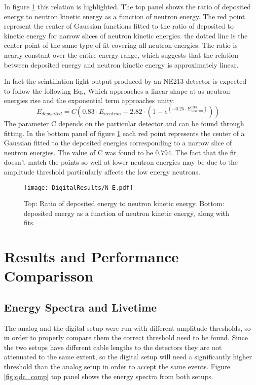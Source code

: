 \documentclass[main.tex]{subfiles}
\begin{document}
In figure \ref{fig:N_E} this relation is highlighted. The top panel shows the ratio of deposited energy to neutron kinetic energy as a function of neutron energy. The red point represent the center of Gaussian functions fitted to the ratio of deposited to kinetic energy for narrow slices of neutron kinetic energies. the dotted line is the center point of the same type of fit covering all neutron energies. The ratio is nearly constant over the entire energy range, which suggests that the relation between deposited energy and neutron kinetic energy is approximately linear.

In fact the scintillation light output produced by an NE213 detector is expected to follow the following Eq.\cite{Scherzinger:2016}, Which approaches a linear shape at as neutron energies rise and the exponential term approaches unity:
\begin{equation}
	E_{deposited} = C\left(  0.83\cdot E_{neutron} - 2.82\cdot\left(  1 - e^{(-0.25\cdot E_{neutron}^{0.93})}  \right)  \right)
\end{equation}
The parameter C depends on the particular detector and can be found through fitting. In the bottom panel of figure \ref{fig:N_E} each red point represents the center of a Gaussian fitted to the deposited energies corresponding to a narrow slice of neutron energies. The value of C was found to be 0.794. The fact that the fit doesn't match the points so well at lower neutron energies may be due to the amplitude threshold particularly affects the low energy neutrons.

\begin{figure}[ht]
    \centering
        \texttt{[image: DigitalResults/N\_E.pdf]}
        \caption[Neutron kinetic energy and deposited energy.]{Top: Ratio of deposited energy to neutron kinetic energy. Bottom: deposited energy as a function of neutron kinetic energy, along with fits.}
    \label{fig:N_E} 
\end{figure}

\section{Results and Performance Comparisson}\label{sec:comp}
\subsection{Energy Spectra and Livetime}
The analog and the digital setup were run with different amplitude thresholds, so in order to properly compare them the correct threshold need to be found. Since the two setups have different cable lengths to the detectors they are not attenuated to the same extent, so the digital setup will need a significantly higher threshold than the analog setup in order to accept the same events. Figure \ref{fig:qdc_comp} top panel shows the energy spectra from both setups.
\end{document}
